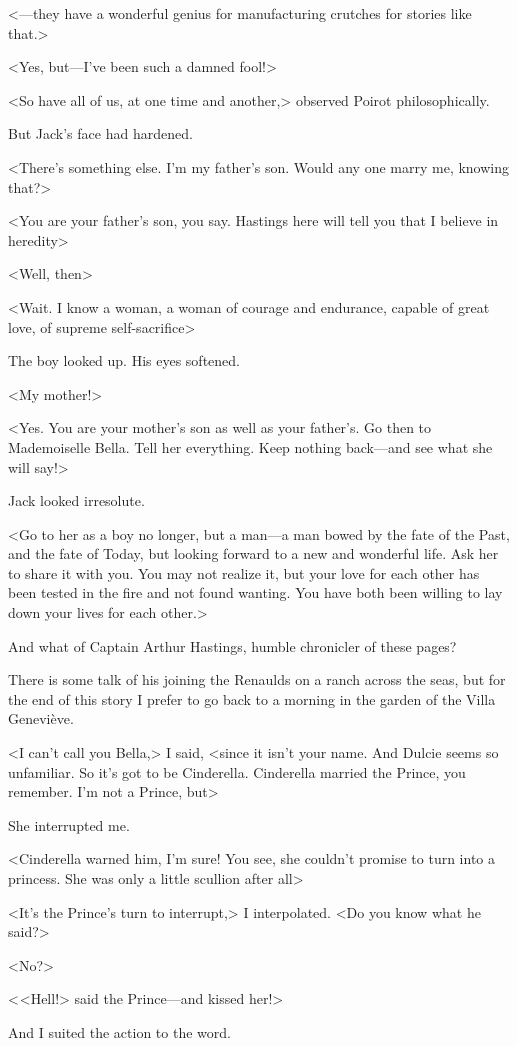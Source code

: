  <—they have a wonderful genius for manufacturing crutches for stories like that.> 

 <Yes, but—I've been such a damned fool!> 

 <So have all of us, at one time and another,> observed Poirot philosophically. 

 But Jack's face had hardened. 

 <There's something else. I'm my father's son. Would any one marry me, knowing that?> 

 <You are your father's son, you say. Hastings here will tell you that I believe in heredity\longdash> 

 <Well, then\longdash> 

 <Wait. I know a woman, a woman of courage and endurance, capable of great love, of supreme self-sacrifice\longdash> 

 The boy looked up. His eyes softened. 

 <My mother!> 

 <Yes. You are your mother's son as well as your father's. Go then to Mademoiselle Bella. Tell her everything. Keep nothing back—and see what she will say!> 

 Jack looked irresolute. 

 <Go to her as a boy no longer, but a man—a man bowed by the fate of the Past, and the fate of Today, but looking forward to a new and wonderful life. Ask her to share it with you. You may not realize it, but your love for each other has been tested in the fire and not found wanting. You have both been willing to lay down your lives for each other.> 

 And what of Captain Arthur Hastings, humble chronicler of these pages? 

 There is some talk of his joining the Renaulds on a ranch across the seas, but for the end of this story I prefer to go back to a morning in the garden of the Villa Geneviève. 

 <I can't call you Bella,> I said, <since it isn't your name. And Dulcie seems so unfamiliar. So it's got to be Cinderella. Cinderella married the Prince, you remember. I'm not a Prince, but\longdash> 

 She interrupted me. 

 <Cinderella warned him, I'm sure! You see, she couldn't promise to turn into a princess. She was only a little scullion after all\longdash> 

 <It's the Prince's turn to interrupt,> I interpolated. <Do you know what he said?> 

 <No?> 

 < <Hell!> said the Prince—and kissed her!> 

 And I suited the action to the word.